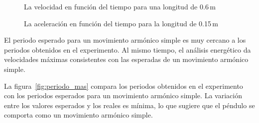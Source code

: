 \documentclass[twocolumn]{article}
\numberwithin{table}{section}
\begin{document}
\begin{figure}[ht]
  \centering
  \caption{La velocidad en función del tiempo para una longitud de
  0.6\,m\label{fig:velocidad_amplitud}}
\end{figure}

\begin{figure}[ht]
  \centering
  \caption{La aceleración en función del tiempo para la longitud de
  0.15\,m\label{fig:aceleración_amplitud}}
\end{figure}


El periodo esperado para un movimiento armónico simple es muy cercano a los
periodos obtenidos en el experimento. Al mismo tiempo, el análisis energético da
velocidades máximas consistentes con las esperadas de un movimiento armónico
simple.

La figura~\ref{fig:periodo_mas} compara los periodos obtenidos en el experimento
con los periodos esperados para un movimiento armónico simple. La variación
entre los valores esperados y los reales es mínima, lo que sugiere
que el péndulo se comporta como un movimiento armónico simple.
\end{document}
